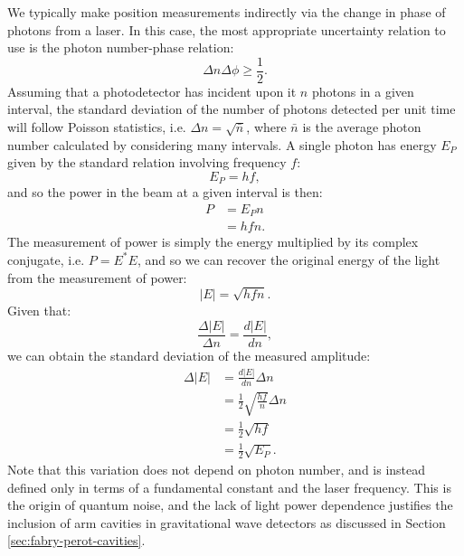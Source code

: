 We typically make position measurements indirectly via the change in phase of photons from a laser. In this case, the most appropriate uncertainty relation to use is the photon number-phase relation:
\begin{equation}
  \label{eq:photon-phase-hup}
  \Delta n \Delta \phi \geq \frac{1}{2}.
\end{equation}
Assuming that a photodetector has incident upon it $n$ photons in a given interval, the standard deviation of the number of photons detected per unit time will follow Poisson statistics, i.e. $\Delta n = \sqrt{\bar{n}}$, where $\bar{n}$ is the average photon number calculated by considering many intervals. A single photon has energy $E_P$ given by the standard relation involving frequency $f$:
\begin{equation}
  E_P = hf,
\end{equation}
and so the power in the beam at a given interval is then:
\begin{equation}
  \begin{split}
    P &= E_P n \\
      &= hfn.
  \end{split}
\end{equation}
The measurement of power is simply the energy multiplied by its complex conjugate, i.e. $P = E^{\ast}E$, and so we can recover the original energy of the light from the measurement of power:
\begin{equation}
  \left| E \right| = \sqrt{hfn}.
\end{equation}
Given that:
\begin{equation}
  \frac{\Delta \left| E \right|}{\Delta n} = \frac{d \left| E \right|}{dn},
\end{equation}
we can obtain the standard deviation of the measured amplitude:
\begin{equation}
  \label{eq:std-dev-amp}
  \begin{split}
    \Delta \left| E \right| &= \frac{d \left| E \right|}{dn} \Delta n \\
                            &= \frac{1}{2} \sqrt{\frac{hf}{n}} \Delta n \\
                            &= \frac{1}{2} \sqrt{hf} \\
                            &= \frac{1}{2} \sqrt{E_P}.
  \end{split}
\end{equation}
Note that this variation does not depend on photon number, and is instead defined only in terms of a fundamental constant and the laser frequency. This is the origin of quantum noise, and the lack of light power dependence justifies the inclusion of arm cavities in gravitational wave detectors as discussed in Section\,\ref{sec:fabry-perot-cavities}.

